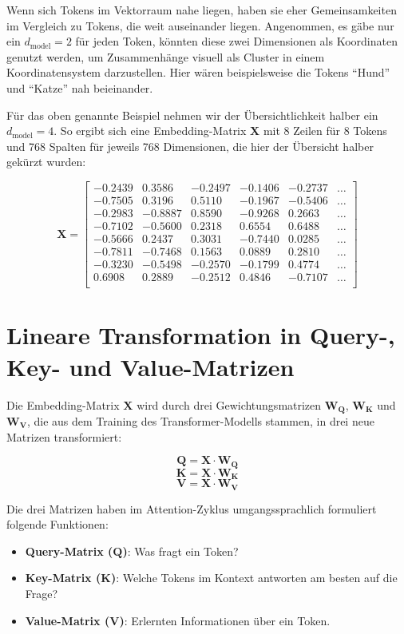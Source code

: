Wenn sich Tokens im Vektorraum nahe liegen, haben sie eher Gemeinsamkeiten im Vergleich zu Tokens, die weit auseinander liegen.  
Angenommen, es gäbe nur ein \( d_{\text{model}} = 2 \) für jeden Token, könnten diese zwei Dimensionen als Koordinaten genutzt werden, um Zusammenhänge visuell als Cluster in einem Koordinatensystem darzustellen.  
Hier wären beispielsweise die Tokens \enquote{Hund} und \enquote{Katze} nah beieinander.

Für das oben genannte Beispiel nehmen wir der Übersichtlichkeit halber ein \( d_{\text{model}} = 4 \).  
So ergibt sich eine Embedding-Matrix $\mathbf{X}$ mit 8 Zeilen für 8 Tokens und 768 Spalten für jeweils 768 Dimensionen, die hier der Übersicht halber gekürzt wurden:

\[
\mathbf{X} =
\begin{bmatrix}
-0.2439 & 0.3586 & -0.2497 & -0.1406 & -0.2737 & \dots \\
-0.7505 & 0.3196 & 0.5110 & -0.1967 & -0.5406 & \dots \\
-0.2983 & -0.8887 & 0.8590 & -0.9268 & 0.2663 & \dots \\
-0.7102 & -0.5600 & 0.2318 & 0.6554 & 0.6488 & \dots \\
-0.5666 & 0.2437 & 0.3031 & -0.7440 & 0.0285 & \dots \\
-0.7811 & -0.7468 & 0.1563 & 0.0889 & 0.2810 & \dots \\
-0.3230 & -0.5498 & -0.2570 & -0.1799 & 0.4774 & \dots \\
0.6908 & 0.2889 & -0.2512 & 0.4846 & -0.7107 & \dots \\
\end{bmatrix}
\]

\section{Lineare Transformation in Query-, Key- und Value-Matrizen}

Die Embedding-Matrix $\mathbf{X}$ wird durch drei Gewichtungsmatrizen $\mathbf{W_Q}$, $\mathbf{W_K}$ und $\mathbf{W_V}$, die aus dem Training des Transformer-Modells stammen, in drei neue Matrizen transformiert:

\[
\mathbf{Q} = \mathbf{X} \cdot \mathbf{W_Q}
\]
\[
\mathbf{K} = \mathbf{X} \cdot \mathbf{W_K}
\]
\[
\mathbf{V} = \mathbf{X} \cdot \mathbf{W_V}
\]

Die drei Matrizen haben im Attention-Zyklus umgangssprachlich formuliert folgende Funktionen:

\begin{itemize}
    \item \textbf{Query-Matrix (\(\mathbf{Q}\))}: Was fragt ein Token?
    \item \textbf{Key-Matrix (\(\mathbf{K}\))}: Welche Tokens im Kontext antworten am besten auf die Frage?
    \item \textbf{Value-Matrix (\(\mathbf{V}\))}: Erlernten Informationen über ein Token.
\end{itemize}

